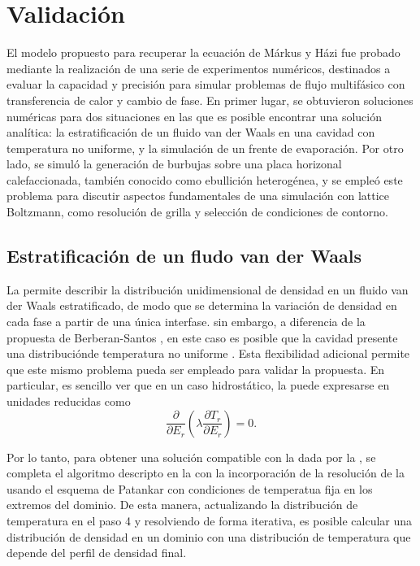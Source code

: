 \section{Validaci\'on}

El modelo propuesto para recuperar la ecuaci\'on de M\'arkus y H\'azi fue probado mediante la realizaci\'on de una serie de experimentos num\'ericos, destinados a evaluar la capacidad y precisi\'on para simular problemas de flujo multif\'asico con transferencia de calor y cambio de fase. En primer lugar, se obtuvieron soluciones num\'ericas para dos situaciones en las que es posible encontrar una soluci\'on anal\'itica: la estratificaci\'on de un fluido van der Waals en una cavidad con temperatura no uniforme, y la simulaci\'on de un frente de evaporaci\'on. Por otro lado, se simul\'o la generaci\'on de burbujas sobre una placa horizonal calefaccionada, tambi\'en conocido como ebullici\'on heterog\'enea, y se emple\'o este problema para discutir aspectos fundamentales de una simulaci\'on con lattice Boltzmann, como resoluci\'on de grilla y selecci\'on de condiciones de contorno.



\subsection{Estratificaci\'on de un fludo van der Waals}

La  permite describir la distribuci\'on unidimensional de densidad en un fluido van der Waals estratificado, de modo que se determina la variaci\'on de densidad en cada fase a partir de una \'unica interfase. sin embargo, a diferencia de la propuesta de Berberan-Santos \cite{berberan-santos_liquidvapor_2002}, en este caso es posible que la cavidad presente una distribuci\'onde temperatura no uniforme \cite{fogliatto_simulation_2019}. Esta flexibilidad adicional permite que este mismo problema pueda ser empleado para validar la \lbe{} propuesta. En particular, es sencillo ver que en un caso hidrost\'atico, la  puede expresarse en unidades reducidas como
\begin{equation}
	\dfrac{\partial}{\partial E_r} \left( \lambda \dfrac{\partial T_r}{\partial E_r} \right) = 0.
	\label{eq:markus_1d}
\end{equation}

Por lo tanto, para obtener una soluci\'on compatible con la \lbe{} dada por la , se completa el algoritmo descripto en la  con la incorporaci\'on de la resoluci\'on de la  usando el esquema de Patankar \cite{patankar_numerical_1980} con condiciones de temperatua fija en los extremos del dominio. De esta manera, actualizando la distribuci\'on de temperatura en el paso 4 y resolviendo de forma iterativa, es posible calcular una distribuci\'on de densidad en un dominio con una distribuci\'on de temperatura que depende del perfil de densidad final. 

